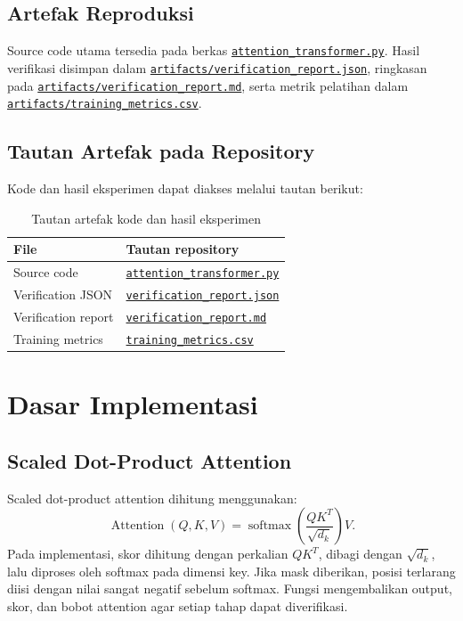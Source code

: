 \documentclass[12pt,a4paper]{article}
\newcommand{\sourcecodelink}{\href{https://github.com/Universitas-Cakrawala/tugas-deep-learning-sesi-10/blob/main/attention_transformer.py}{\nolinkurl{attention_transformer.py}}}
\newcommand{\verificationjsonlink}{\href{https://github.com/Universitas-Cakrawala/tugas-deep-learning-sesi-10/blob/main/artifacts/verification_report.json}{\nolinkurl{artifacts/verification_report.json}}}
\newcommand{\verificationmdlink}{\href{https://github.com/Universitas-Cakrawala/tugas-deep-learning-sesi-10/blob/main/artifacts/verification_report.md}{\nolinkurl{artifacts/verification_report.md}}}
\newcommand{\metricslink}{\href{https://github.com/Universitas-Cakrawala/tugas-deep-learning-sesi-10/blob/main/artifacts/training_metrics.csv}{\nolinkurl{artifacts/training_metrics.csv}}}
\begin{document}
\subsection{Artefak Reproduksi}
Source code utama tersedia pada berkas \sourcecodelink.
Hasil verifikasi disimpan dalam \verificationjsonlink, ringkasan pada
\verificationmdlink, serta metrik pelatihan dalam \metricslink.

\subsection{Tautan Artefak pada Repository}
Kode dan hasil eksperimen dapat diakses melalui tautan berikut:
\begin{table}[H]
    \centering
    \caption{Tautan artefak kode dan hasil eksperimen}
    \label{tab:artifact-links}
    \renewcommand{\arraystretch}{1.3}
    \begin{tabular}{l p{9.5cm}}
        \toprule
        \textbf{File} & \textbf{Tautan repository} \\
        \midrule
        Source code &
        \href{https://github.com/Universitas-Cakrawala/tugas-deep-learning-sesi-10/blob/main/attention_transformer.py}
        {\nolinkurl{attention\_transformer.py}} \\
        Verification JSON &
        \href{https://github.com/Universitas-Cakrawala/tugas-deep-learning-sesi-10/blob/main/artifacts/verification_report.json}
        {\nolinkurl{verification\_report.json}} \\
        Verification report &
        \href{https://github.com/Universitas-Cakrawala/tugas-deep-learning-sesi-10/blob/main/artifacts/verification_report.md}
        {\nolinkurl{verification\_report.md}} \\
        Training metrics &
        \href{https://github.com/Universitas-Cakrawala/tugas-deep-learning-sesi-10/blob/main/artifacts/training_metrics.csv}
        {\nolinkurl{training\_metrics.csv}} \\
        \bottomrule
    \end{tabular}
\end{table}

\section{Dasar Implementasi}

\subsection{Scaled Dot-Product Attention}
Scaled dot-product attention dihitung menggunakan:
\begin{equation}
    \operatorname{Attention}(Q,K,V)
    =
    \operatorname{softmax}\left(\frac{QK^{T}}{\sqrt{d_k}}\right)V.
\end{equation}
Pada implementasi, skor dihitung dengan perkalian $QK^T$, dibagi dengan
$\sqrt{d_k}$, lalu diproses oleh softmax pada dimensi key. Jika mask diberikan,
posisi terlarang diisi dengan nilai sangat negatif sebelum softmax. Fungsi
mengembalikan output, skor, dan bobot attention agar setiap tahap dapat
diverifikasi.
\end{document}
